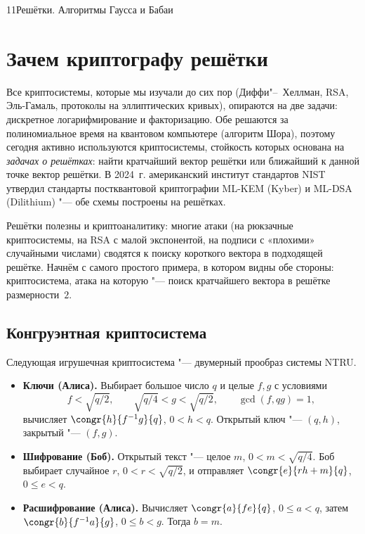 \begin{lecture}{11}{Решётки. Алгоритмы Гаусса и Бабаи}

\section{Зачем криптографу решётки}

Все криптосистемы, которые мы изучали до сих пор (Диффи"--~Хеллман, RSA, Эль-Гамаль, протоколы
на эллиптических кривых), опираются на две задачи: дискретное логарифмирование и факторизацию.
Обе решаются за полиномиальное время на квантовом компьютере (алгоритм Шора), поэтому сегодня
активно используются криптосистемы, стойкость которых основана на \emph{задачах о решётках}:
найти кратчайший вектор решётки или ближайший к данной точке вектор решётки. В 2024~г.
американский институт стандартов NIST утвердил стандарты постквантовой криптографии ML-KEM
(Kyber) и ML-DSA (Dilithium) "--- обе схемы построены на решётках.

Решётки полезны и криптоаналитику: многие атаки (на рюкзачные криптосистемы, на RSA с малой
экспонентой, на подписи с «плохими» случайными числами) сводятся к поиску короткого вектора
в подходящей решётке. Начнём с самого простого примера, в котором видны обе стороны:
криптосистема, атака на которую "--- поиск кратчайшего вектора в решётке размерности~$2$.

\subsection{Конгруэнтная криптосистема}

Следующая игрушечная криптосистема \cite[разд.~7.1]{hps} "--- двумерный прообраз системы NTRU.

\begin{itemize}
  \item \textbf{Ключи (Алиса).} Выбирает большое число $q$ и целые $f, g$ с условиями
    \[
      f < \sqrt{q/2}, \qquad \sqrt{q/4} < g < \sqrt{q/2}, \qquad \gcd(f, qg) = 1,
    \]
    вычисляет $\congr{h}{f^{-1} g}{q}$, $0 < h < q$. Открытый ключ "--- $(q, h)$, закрытый "---
    $(f, g)$.
  \item \textbf{Шифрование (Боб).} Открытый текст "--- целое $m$, $0 < m < \sqrt{q/4}$. Боб
    выбирает случайное $r$, $0 < r < \sqrt{q/2}$, и отправляет $\congr{e}{rh + m}{q}$, $0 \le e < q$.
  \item \textbf{Расшифрование (Алиса).} Вычисляет $\congr{a}{fe}{q}$, $0 \le a < q$, затем
    $\congr{b}{f^{-1} a}{g}$, $0 \le b < g$. Тогда $b = m$.
\end{itemize}


\end{lecture}
